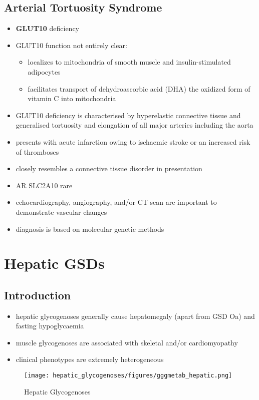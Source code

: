 \documentclass[12pt]{scrartcl}
\begin{document}
\subsection{Arterial Tortuosity Syndrome}
\label{sec:org00c4030}
\begin{itemize}
\item \textbf{GLUT10} deficiency
\item GLUT10 function not entirely clear:
\begin{itemize}
\item localizes to mitochondria of smooth muscle and insulin-stimulated adipocytes
\item facilitates transport of dehydroascorbic acid (DHA) the
oxidized form of vitamin C into mitochondria
\end{itemize}
\item GLUT10 deficiency is characterised by hyperelastic connective tissue
and generalised tortuosity and elongation of all major arteries
including the aorta
\item presents with acute infarction owing to ischaemic stroke or an
increased risk of thromboses
\item closely resembles a connective tissue disorder in presentation
\item AR SLC2A10 rare
\item echocardiography, angiography, and/or CT scan are important to demonstrate vascular changes
\item diagnosis is based on molecular genetic methods
\end{itemize}
\section{Hepatic GSDs}
\label{sec:orgba43dc4}
\subsection{Introduction}
\label{sec:org8c0d48d}
\begin{itemize}
\item hepatic glycogenoses generally cause hepatomegaly (apart from GSD
Oa) and fasting hypoglycaemia
\item muscle glycogenoses are associated with skeletal and/or
cardiomyopathy
\item clinical phenotypes are extremely heterogeneous
\end{itemize}

\begin{figure}[htbp]
\centering
\texttt{[image: hepatic\_glycogenoses/figures/gggmetab\_hepatic.png]}
\caption{\label{fig:orgea8541d}Hepatic Glycogenoses}
\end{figure}
\end{document}
